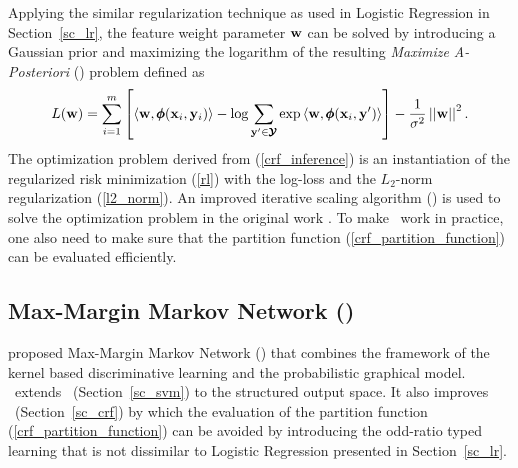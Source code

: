 {Applying the similar regularization technique as used in Logistic Regression in Section~\ref{sc_lr}, the feature weight parameter $\mathbf {w}$ can be solved by introducing a Gaussian prior and maximizing the logarithm of the resulting \textit{Maximize A-Posteriori} (\map) problem \citep{taskar02} defined as
\begin{align}
	L(\mathbf {w}) = \sum_{i=1}^{m}\left[\langle \mathbf {w}, \pmb \phi(\mathbf {x}_i,\mathbf {y}_i) \rangle-\log{\sum_{\mathbf {y}'\in\pmb {\mathcal{Y}}}{\exp{\langle \mathbf {w}, \pmb \phi(\mathbf {x}_i,\mathbf {y}') \rangle}}}\right] - \frac{1}{\sigma^2}\left|\left| \mathbf {w} \right|\right|^2. \label{crf_inference}
\end{align}
The optimization problem derived from (\ref{crf_inference}) is an instantiation of the regularized risk minimization (\ref{rl}) with the log-loss and the $L_2$-norm regularization (\ref{l2_norm}).
An improved iterative scaling algorithm (\iis) \citep{Pietra97inducing} is used to solve the optimization problem in the original work \citep{lafferty01}.
To make \crf\ work in practice, one also need to make sure that the partition function (\ref{crf_partition_function}) can be evaluated efficiently.



%
% 
\subsection{Max-Margin Markov Network (\mmmn)} \label{sc_mmmn}

\citet{Taskar04max} proposed Max-Margin Markov Network (\mmmn) that combines the framework of the kernel based discriminative learning and the probabilistic graphical model.
\mmmn\ extends \svm\ (Section~\ref{sc_svm}) to the structured output space.
It also improves \crf\ (Section~\ref{sc_crf}) by which the evaluation of the partition function (\ref{crf_partition_function}) can be avoided by introducing the odd-ratio typed learning that is not dissimilar to Logistic Regression presented in Section~\ref{sc_lr}.

}
